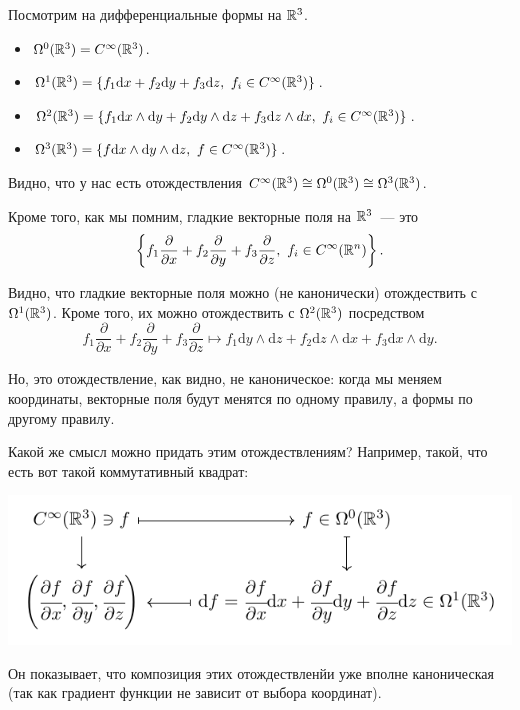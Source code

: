 		\begin{example}
		Посмотрим на дифференциальные формы на $\mathbb{R}^3$. 

		\begin{itemize}
			\item $\Omega^{0}(\mathbb{R}^3) = C^{\infty}(\mathbb{R}^3)$.

			\item $\Omega^1(\mathbb{R}^3) = \{ f_1 \mathrm{d}x + f_2 \mathrm{d}y + f_3 \mathrm{d}z, \ f_i \in C^{\infty}(\mathbb{R}^3) \}$.

			\item $\Omega^{2}(\mathbb{R}^3) = \{ f_1 \mathrm{d}x \wedge \mathrm{d}y + f_2 \mathrm{d}y \wedge \mathrm{d}z + f_3 \mathrm{d}z \wedge dx, \ f_i \in C^{\infty}(\mathbb{R}^3) \}$.

			\item $\Omega^{3}(\mathbb{R}^3) = \{ f \mathrm{d}x \wedge \mathrm{d}y \wedge \mathrm{d}z, \ f \in C^{\infty}(\mathbb{R}^3) \} $.
		\end{itemize}

		Видно, что у нас есть отождествления $C^{\infty}(\mathbb{R}^3) \cong \Omega^0(\mathbb{R}^3) \cong \Omega^{3}(\mathbb{R}^3)$.

		Кроме того, как мы помним, гладкие векторные поля на $\mathbb{R}^3$~--- это 
		\[
			\left\{ f_1 \frac{\partial}{\partial x} + f_2 \frac{\partial}{\partial y} + f_3 \frac{\partial}{\partial z}, \ f_i \in C^{\infty}(\mathbb{R}^n) \right\}.
		\]

		 Видно, что гладкие векторные поля можно (не канонически) отождествить с $\Omega^1(\mathbb{R}^3)$. Кроме того, их можно отождествить с $\Omega^2(\mathbb{R}^3)$ посредством 
		\[
			f_1 \frac{\partial}{\partial x} + f_2 \frac{\partial}{\partial y} + f_3 \frac{\partial}{\partial z}  \mapsto f_1 \mathrm{d}y \wedge \mathrm{d}z + f_2  \mathrm{d}z \wedge \mathrm{d}x + f_3 \mathrm{d}x \wedge \mathrm{d}y.
		\]

		Но, это отождествление, как видно, не каноническое: когда мы  меняем координаты, векторные поля будут менятся по одному правилу, а формы по другому правилу. 

		Какой же смысл можно придать этим отождествлениям? Например, такой, что есть вот такой коммутативный квадрат: 
		\begin{center}
			\includegraphics{lectures/7/pictures/cd_1.pdf}
		\end{center}	
		Он показывает, что композиция этих отождествленйи уже вполне каноническая (так как градиент функции не зависит от выбора координат). 


\end{example}
